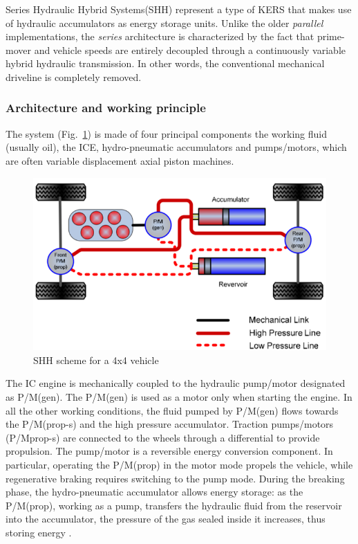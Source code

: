\documentclass[11pt]{article}
\begin{document}
Series Hydraulic Hybrid Systems(SHH) represent a type of KERS that makes use of hydraulic accumulators as energy storage units. Unlike the older \textit{parallel} implementations, the \textit{series} architecture is characterized by the fact that prime-mover and vehicle speeds are entirely decoupled through a continuously variable hybrid hydraulic transmission. In other words, the conventional mechanical driveline is completely removed.

\subsubsection{Architecture and working principle}

The system (Fig.~\ref{SHH_scheme}) is made of four principal components \cite{d} the working fluid (usually oil), the ICE, hydro-pneumatic accumulators and pumps/motors, which are often variable displacement axial piston machines.

\begin{figure}[H]
\centering
\includegraphics[width=.6\textwidth]{Images/State_of_the_art/Hydraulic KERS.png}
\caption{SHH scheme for a 4x4 vehicle}
\label{SHH_scheme}
\end{figure}

The IC engine is mechanically coupled to the hydraulic pump/motor designated as P/M(gen). The P/M(gen) is used as a motor only when starting the engine. In all the other working conditions, the fluid pumped by P/M(gen) flows towards the P/M(prop-s) and the high pressure accumulator. Traction pumps/motors (P/Mprop-s) are connected to the wheels through a differential to provide propulsion. The pump/motor is a reversible energy conversion component. In particular, operating the P/M(prop) in the motor mode propels the vehicle, while regenerative braking requires switching to the pump mode. During the breaking phase, the hydro-pneumatic accumulator allows energy storage: as the P/M(prop), working as a pump, transfers the hydraulic fluid from the reservoir into the accumulator, the pressure of the gas sealed inside it increases, thus storing energy \cite{e}. 
\end{document}
